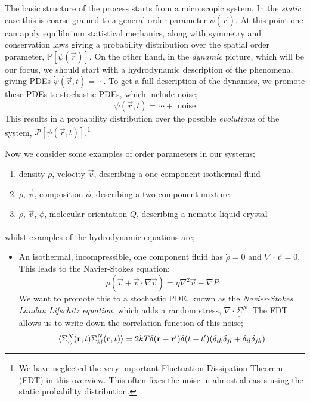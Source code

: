 \paraskip
The basic structure of the process starts from a microscopic system. In the \emph{static} case this is coarse grained to a general order parameter $\psi(\vec r)$. At this point one can apply equilibrium statistical mechanics, along with symmetry and conservation laws giving a probability distribution over the spatial order parameter, $\mathbb{P}\left[\psi(\vec r)\right]$. On the other hand, in the \emph{dynamic} picture, which will be our focus, we should start with a hydrodynamic description of the phenomena, giving PDEs $\dot{\psi}(\vec r, t) = \cdots$. To get a full description of the dynamics, we promote these PDEs to stochastic PDEs, which include noise;
\begin{equation}
\dot{\psi}(\vec r, t) = \cdots + \text{ noise}
\end{equation}
This results in a probability distribution over the possible \emph{evolutions} of the system, $\mathcal{P}\left[\psi(\vec r, t)\right]$.\footnote{We have neglected the very important Fluctuation Dissipation Theorem (FDT) in this overview. This often fixes the noise in almost al cases using the static probability distribution.}

\paraskip
Now we consider some examples of order parameters in our systems;
\begin{enumerate}
\item density $\rho$, velocity $\vec v$, describing a one component isothermal fluid
\item $\rho$, $\vec v$, composition $\phi$, describing a two component mixture
\item $\rho$, $\vec v$, $\phi$, molecular orientation $\underline{\underline{Q}}$, describing a nematic liquid crystal
\end{enumerate}
whilst examples of the hydrodynamic equations are;
\begin{itemize}
\item An isothermal, incompressible, one component fluid has $\dot{\rho} = 0$ and $\nabla \cdot \vec v = 0$. This leads to the Navier-Stokes equation;
\begin{equation}
\rho\left(\dot{\vec v} + \vec v \cdot \nabla \vec v\right) = \eta \nabla^2 \vec v - \nabla P
\end{equation}
We want to promote this to a stochastic PDE, known as the \emph{Navier-Stokes Landau Lifschitz equation}, which adds a random stress, $\nabla \cdot \underline{\underline{\Sigma}}^N$. The FDT allows us to write down the correlation function of this noise;
\begin{equation}
\langle \Sigma^N_{ij}(\vec r, t) \Sigma^N_{kl}(\vec r, t) \rangle = 2kT \delta(\vec r - \vec r\pr)\delta(t - t\pr)\left(\delta_{ik}\delta_{jl} + \delta_{il}\delta_{jk}\right)
\end{equation}
\end{itemize}
